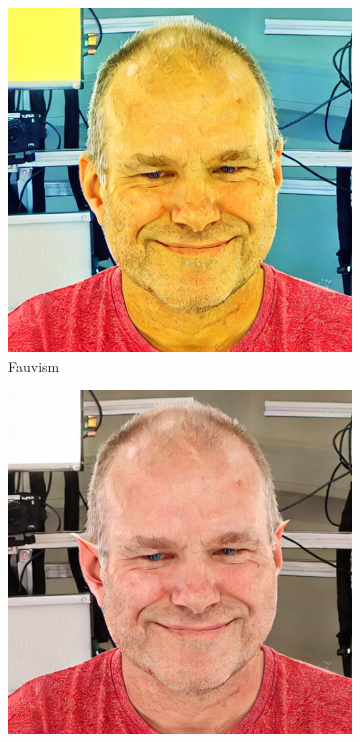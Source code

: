 \begin{figure}
\begin{subfigure}{0.18\linewidth}
        \includegraphics[width=\textwidth]{Figures/naive/low_cfg/ipix2pix_sven_fauvism/0-2-4-2-293_210300_829.png}
        \caption{Fauvism}
	\end{subfigure}
    \begin{subfigure}{0.18\linewidth}
        \includegraphics[width=\textwidth]{Figures/naive/default/ipix2pix_sven_elf/0-2-4-2-293_210300_829.png}

\end{subfigure}
\end{figure}
